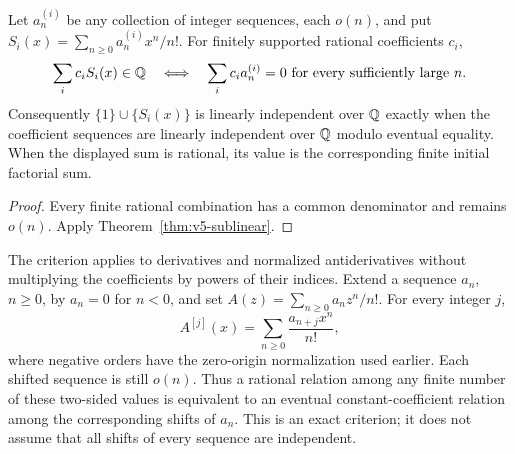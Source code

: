 \begin{corollary}
\label{cor:v5-sequence-classification}
Let $a^{(i)}_n$ be any collection of integer sequences, each $o(n)$,
and put $S_i(x)=\sum_{n\geq0}a^{(i)}_nx^n/n!$.
For finitely supported rational coefficients $c_i$,
\[
 \sum_i c_iS_i(x)\in\mathbb Q
 \quad\Longleftrightarrow\quad
 \sum_i c_i a^{(i)}_n=0
 \text{ for every sufficiently large }n.
\]
Consequently $\{1\}\cup\{S_i(x)\}$ is linearly independent over
$\mathbb Q$ exactly when the coefficient sequences are linearly independent
over $\mathbb Q$ modulo eventual equality.  When the displayed sum is rational,
its value is the corresponding finite initial factorial sum.
\end{corollary}
\begin{proof}
Every finite rational combination has a common denominator and remains
$o(n)$.  Apply Theorem~\ref{thm:v5-sublinear}.
\end{proof}

The criterion applies to derivatives and normalized antiderivatives
without multiplying the coefficients by powers of their indices.
Extend a sequence $a_n$, $n\geq0$, by $a_n=0$ for $n<0$, and set
$A(z)=\sum_{n\geq0}a_nz^n/n!$.  For every integer $j$,
\[
 A^{[j]}(x)=\sum_{n\geq0}\frac{a_{n+j}x^n}{n!},
\]
where negative orders have the zero-origin normalization used earlier.
Each shifted sequence is still $o(n)$.  Thus a rational relation among
any finite number of these two-sided values is equivalent to an
eventual constant-coefficient relation among the corresponding shifts
of $a_n$.  This is an exact criterion; it does not assume that all shifts
of every sequence are independent.

